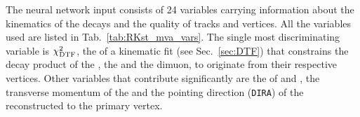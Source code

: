 The neural network input consists of 24 variables carrying information about the kinematics of the decays
and the quality of tracks and vertices. All the variables used are listed in Tab.~\ref{tab:RKst_mva_vars}.
The single most discriminating variable is $\chi^2_{\rm DTF}$, the \chisq of a kinematic fit (see Sec.~\ref{sec:DTF})
that constrains the decay product of the \Bz, the \Kstarz and the dimuon, to originate from their respective vertices.
Other variables that contribute significantly are the \chisqip of \jpsi and \Kstarz, the transverse momentum
of the \Bz and the pointing direction (\verb!DIRA!) of the reconstructed \Bz to the primary vertex.
%
%
\begin{table}
\centering
\caption{List of variables used as inputs for the neural-network training.
}
\label{tab:RKst_mva_vars}
\end{table}
